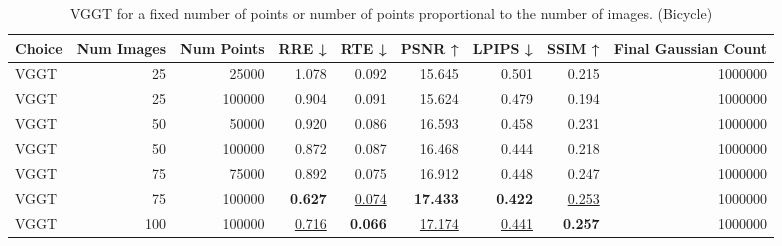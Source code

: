 \begin{table}[H]
\caption{VGGT for a fixed number of points or number of points proportional to the number of images. (Bicycle)}
\label{tab:01_num_images_fixed_points_bicycle}
\small
\begin{tabular}{lrrrrrrrr}
\toprule
Choice & Num Images & Num Points & RRE ↓ & RTE ↓ & PSNR ↑ & LPIPS ↓ & SSIM ↑ & Final Gaussian Count \\
\midrule
VGGT & 25 & 25000 & 1.078 & 0.092 & 15.645 & 0.501 & 0.215 & 1000000 \\
VGGT & 25 & 100000 & 0.904 & 0.091 & 15.624 & 0.479 & 0.194 & 1000000 \\
VGGT & 50 & 50000 & 0.920 & 0.086 & 16.593 & 0.458 & 0.231 & 1000000 \\
VGGT & 50 & 100000 & 0.872 & 0.087 & 16.468 & 0.444 & 0.218 & 1000000 \\
VGGT & 75 & 75000 & 0.892 & 0.075 & 16.912 & 0.448 & 0.247 & 1000000 \\
VGGT & 75 & 100000 & \textbf{0.627} & \underline{0.074} & \textbf{17.433} & \textbf{0.422} & \underline{0.253} & 1000000 \\
VGGT & 100 & 100000 & \underline{0.716} & \textbf{0.066} & \underline{17.174} & \underline{0.441} & \textbf{0.257} & 1000000 \\
\bottomrule
\end{tabular}
\end{table}